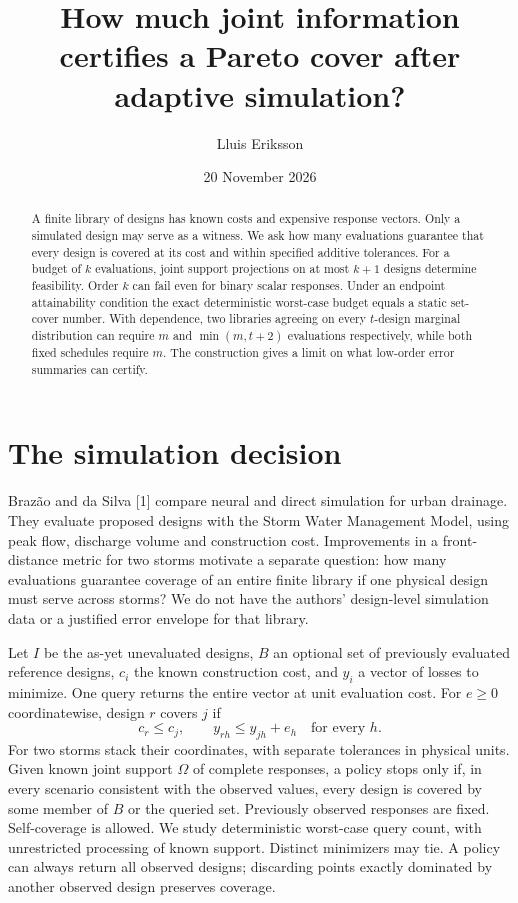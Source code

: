 \documentclass[11pt]{article}
\title{How much joint information certifies a Pareto cover after adaptive simulation?}
\author{Lluis Eriksson}\date{20 November 2026}
\begin{document}
\maketitle
\begin{abstract}
A finite library of designs has known costs and expensive response vectors. Only a simulated design may serve as a witness. We ask how many evaluations guarantee that every design is covered at its cost and within specified additive tolerances. For a budget of \(k\) evaluations, joint support projections on at most \(k+1\) designs determine feasibility. Order \(k\) can fail even for binary scalar responses. Under an endpoint attainability condition the exact deterministic worst-case budget equals a static set-cover number. With dependence, two libraries agreeing on every \(t\)-design marginal distribution can require \(m\) and \(\min(m,t+2)\) evaluations respectively, while both fixed schedules require \(m\). The construction gives a limit on what low-order error summaries can certify.
\end{abstract}

\section{The simulation decision}
Braz\~ao and da Silva [1] compare neural and direct simulation for urban drainage. They evaluate proposed designs with the Storm Water Management Model, using peak flow, discharge volume and construction cost. Improvements in a front-distance metric for two storms motivate a separate question: how many evaluations guarantee coverage of an entire finite library if one physical design must serve across storms? We do not have the authors' design-level simulation data or a justified error envelope for that library.

Let \(I\) be the as-yet unevaluated designs, \(B\) an optional set of previously evaluated reference designs, \(c_i\) the known construction cost, and \(y_i\) a vector of losses to minimize. One query returns the entire vector at unit evaluation cost. For \(e\geq0\) coordinatewise, design \(r\) covers \(j\) if
\[
             c_r\leq c_j,\qquad y_{rh}\leq y_{jh}+e_h\quad\text{for every }h.
\]
For two storms stack their coordinates, with separate tolerances in physical units. Given known joint support \(\Omega\) of complete responses, a policy stops only if, in every scenario consistent with the observed values, every design is covered by some member of \(B\) or the queried set. Previously observed responses are fixed. Self-coverage is allowed. We study deterministic worst-case query count, with unrestricted processing of known support. Distinct minimizers may tie. A policy can always return all observed designs; discarding points exactly dominated by another observed design preserves coverage.
\end{document}
